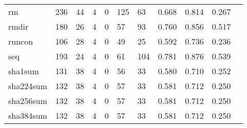 \begin{longtable}{lp{1.10cm}p{1.10cm}p{1.10cm}p{1.10cm}p{1.10cm}p{1.10cm}p{1.10cm}p{1.10cm}p{1.10cm}p{1.10cm}}
rm        &                    236 &                                 44 &                                 4 &                                0 &                               125 &                              63 &                          0.668 &                                 0.814 &                               0.267 \\
rmdir     &                    180 &                                 26 &                                 4 &                                0 &                                57 &                              93 &                          0.760 &                                 0.856 &                               0.517 \\
runcon    &                    106 &                                 28 &                                 4 &                                0 &                                49 &                              25 &                          0.592 &                                 0.736 &                               0.236 \\
seq       &                    193 &                                 24 &                                 4 &                                0 &                                61 &                             104 &                          0.781 &                                 0.876 &                               0.539 \\
sha1sum   &                    131 &                                 38 &                                 4 &                                0 &                                56 &                              33 &                          0.580 &                                 0.710 &                               0.252 \\
sha224sum &                    132 &                                 38 &                                 4 &                                0 &                                57 &                              33 &                          0.581 &                                 0.712 &                               0.250 \\
sha256sum &                    132 &                                 38 &                                 4 &                                0 &                                57 &                              33 &                          0.581 &                                 0.712 &                               0.250 \\
sha384sum &                    132 &                                 38 &                                 4 &                                0 &                                57 &                              33 &                          0.581 &                                 0.712 &                               0.250 \\

\end{longtable}
